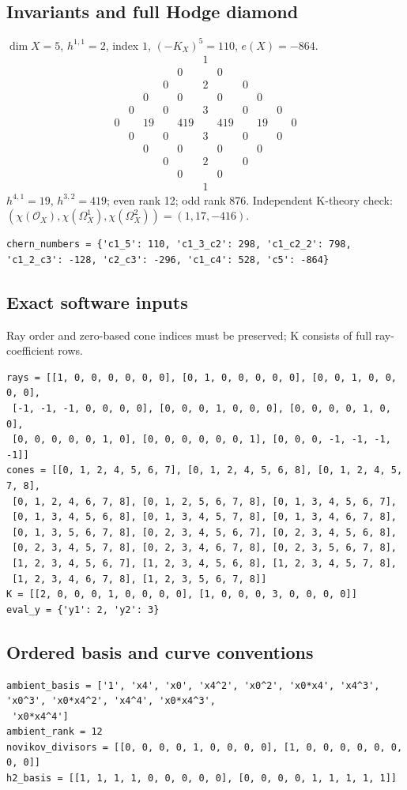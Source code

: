 \documentclass[10pt,a4paper]{article}
\begin{document}
\subsection*{Invariants and full Hodge diamond}
$\dim X=5$, $h^{1,1}=2$, index $1$, $(-K_X)^5=110$, $e(X)=-864$.
\[\begin{array}{ccccccccccc}&&&&&1&&&&&\\&&&&0&&0&&&&\\&&&0&&2&&0&&&\\&&0&&0&&0&&0&&\\&0&&0&&3&&0&&0&\\0&&19&&419&&419&&19&&0\\&0&&0&&3&&0&&0&\\&&0&&0&&0&&0&&\\&&&0&&2&&0&&&\\&&&&0&&0&&&&\\&&&&&1&&&&&\end{array}\]
$h^{4,1}=19$, $h^{3,2}=419$; even rank 12; odd rank 876.
Independent K-theory check: $(\chi(\mathcal O_X),\chi(\Omega_X^1),\chi(\Omega_X^2))=(1, 17, -416)$.
\begin{lstlisting}
chern_numbers = {'c1_5': 110, 'c1_3_c2': 298, 'c1_c2_2': 798, 'c1_2_c3': -128, 'c2_c3': -296, 'c1_c4': 528, 'c5': -864}
\end{lstlisting}
\subsection*{Exact software inputs}
Ray order and zero-based cone indices must be preserved; K consists of full ray-coefficient rows.
\begin{lstlisting}
rays = [[1, 0, 0, 0, 0, 0, 0], [0, 1, 0, 0, 0, 0, 0], [0, 0, 1, 0, 0, 0, 0],
 [-1, -1, -1, 0, 0, 0, 0], [0, 0, 0, 1, 0, 0, 0], [0, 0, 0, 0, 1, 0, 0],
 [0, 0, 0, 0, 0, 1, 0], [0, 0, 0, 0, 0, 0, 1], [0, 0, 0, -1, -1, -1, -1]]
cones = [[0, 1, 2, 4, 5, 6, 7], [0, 1, 2, 4, 5, 6, 8], [0, 1, 2, 4, 5, 7, 8],
 [0, 1, 2, 4, 6, 7, 8], [0, 1, 2, 5, 6, 7, 8], [0, 1, 3, 4, 5, 6, 7],
 [0, 1, 3, 4, 5, 6, 8], [0, 1, 3, 4, 5, 7, 8], [0, 1, 3, 4, 6, 7, 8],
 [0, 1, 3, 5, 6, 7, 8], [0, 2, 3, 4, 5, 6, 7], [0, 2, 3, 4, 5, 6, 8],
 [0, 2, 3, 4, 5, 7, 8], [0, 2, 3, 4, 6, 7, 8], [0, 2, 3, 5, 6, 7, 8],
 [1, 2, 3, 4, 5, 6, 7], [1, 2, 3, 4, 5, 6, 8], [1, 2, 3, 4, 5, 7, 8],
 [1, 2, 3, 4, 6, 7, 8], [1, 2, 3, 5, 6, 7, 8]]
K = [[2, 0, 0, 0, 1, 0, 0, 0, 0], [1, 0, 0, 0, 3, 0, 0, 0, 0]]
eval_y = {'y1': 2, 'y2': 3}
\end{lstlisting}
\subsection*{Ordered basis and curve conventions}
\begin{lstlisting}
ambient_basis = ['1', 'x4', 'x0', 'x4^2', 'x0^2', 'x0*x4', 'x4^3', 'x0^3', 'x0*x4^2', 'x4^4', 'x0*x4^3',
 'x0*x4^4']
ambient_rank = 12
novikov_divisors = [[0, 0, 0, 0, 1, 0, 0, 0, 0], [1, 0, 0, 0, 0, 0, 0, 0, 0]]
h2_basis = [[1, 1, 1, 1, 0, 0, 0, 0, 0], [0, 0, 0, 0, 1, 1, 1, 1, 1]]
\end{lstlisting}
\end{document}
